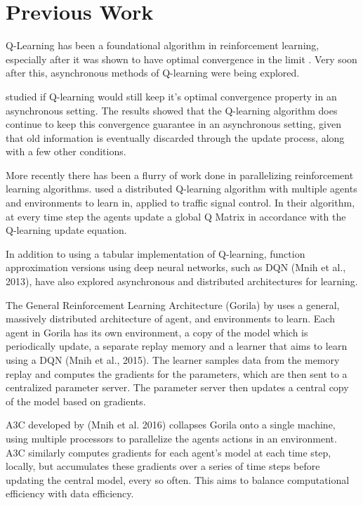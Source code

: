 \documentclass[jair,twoside,11pt,theapa]{article}
\begin{document}
\section{Previous Work}
\label{Literature Survey}
Q-Learning \cite{watkins} has been a foundational algorithm in reinforcement learning, especially after it was shown to have optimal convergence in the limit \cite{qlearning}. Very soon after this, asynchronous methods of Q-learning were being explored.  

\cite{Tsitsiklis1994} studied if Q-learning would still keep it's optimal convergence property in an asynchronous setting. The results showed that the Q-learning algorithm does continue to keep this convergence guarantee in an asynchronous setting, given that old information is eventually discarded through the update process, along with a few other conditions. 

More recently there has been a flurry of work done in parallelizing reinforcement learning algorithms. \cite{MANNION2015956} used a distributed Q-learning algorithm with multiple agents and environments to learn in, applied to traffic signal control. In their algorithm, at every time step the agents update a global Q Matrix in accordance with the Q-learning update equation. 

In addition to using a tabular implementation of Q-learning, function approximation versions using deep neural networks, such as DQN (Mnih et al., 2013), have also explored asynchronous and distributed architectures for learning. 

The General Reinforcement Learning Architecture (Gorila) by \cite{Gorila} uses a general, massively distributed architecture of agent, and environments to learn. Each agent in Gorila has its own environment, a copy of the model which is periodically update, a separate replay memory and a learner that aims to learn using a DQN (Mnih et al., 2015). The learner samples data from the memory replay and computes the gradients for the parameters, which are then sent to a centralized parameter server. The parameter server then updates a central copy of the model based on gradients. 

A3C developed by (Mnih et al. 2016) collapses Gorila onto a single machine, using multiple processors to parallelize the agents actions in an environment. A3C similarly computes gradients for each agent's model at each time step, locally, but accumulates these gradients over a series of time steps before updating the central model, every so often. This aims to balance computational efficiency with data efficiency. 
\end{document}
